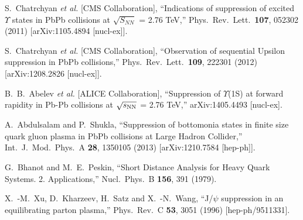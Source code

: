 \documentclass[aps,prc,preprint,superscriptaddress,showpacs,showkeys]{revtex4-1}
\begin{document}
\begin{thebibliography}{100}
  S.~Chatrchyan {\it et al.}  [CMS Collaboration],
  ``Indications of suppression of excited $\Upsilon$ states in PbPb collisions at $\sqrt{S_{NN}}$ = 2.76 TeV,''
  Phys.\ Rev.\ Lett.\  {\bf 107}, 052302 (2011)
  [arXiv:1105.4894 [nucl-ex]].


  S.~Chatrchyan {\it et al.}  [CMS Collaboration],
  ``Observation of sequential Upsilon suppression in PbPb collisions,''
  Phys.\ Rev.\ Lett.\  {\bf 109}, 222301 (2012)
  [arXiv:1208.2826 [nucl-ex]].

  B.~B.~Abelev {\it et al.}  [ALICE Collaboration],
  ``Suppression of $\Upsilon$(1S) at forward rapidity in Pb-Pb collisions at $\sqrt{s_{\rm NN}}$ = 2.76 TeV,''
  arXiv:1405.4493 [nucl-ex].

  A.~Abdulsalam and P.~Shukla,
  ``Suppression of bottomonia states in finite size quark gluon plasma in PbPb collisions at Large Hadron Collider,''
  Int.\ J.\ Mod.\ Phys.\ A {\bf 28}, 1350105 (2013)
  [arXiv:1210.7584 [hep-ph]].


  G.~Bhanot and M.~E.~Peskin,
  ``Short Distance Analysis for Heavy Quark Systems. 2. Applications,''
  Nucl.\ Phys.\ B {\bf 156}, 391 (1979).


  X.~-M.~Xu, D.~Kharzeev, H.~Satz and X.~-N.~Wang,
  ``J/$\psi$ suppression in an equilibrating parton plasma,''
  Phys.\ Rev.\ C {\bf 53}, 3051 (1996)
  [hep-ph/9511331].


\end{thebibliography}
\end{document}
